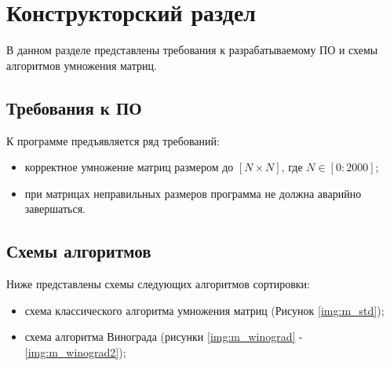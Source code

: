 \chapter{Конструкторский раздел}
В данном разделе представлены требования к разрабатываемому ПО и схемы алгоритмов умножения матриц.

\section{Требования к ПО}

К программе предъявляется ряд требований:
\begin{itemize}
	\item корректное умножение матриц размером до $[N \times N]$, где $N\in[0:2000]$;
	\item при матрицах неправильных размеров программа не должна аварийно завершаться.
\end{itemize}

\section{Схемы алгоритмов}
Ниже представлены схемы следующих алгоритмов сортировки:
\begin{itemize}
	\item схема классического алгоритма умножения матриц (Рисунок \ref{img:m_std});
	\item схема алгоритма Винограда (рисунки \ref{img:m_winograd} - \ref{img:m_winograd2});
\end{itemize}


